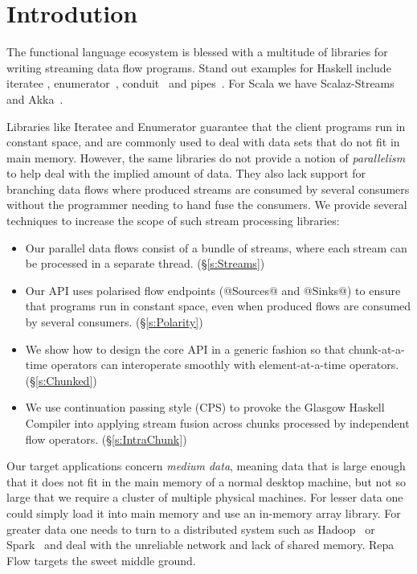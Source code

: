 \section{Introdution}

The functional language ecosystem is blessed with a multitude of libraries for writing streaming data flow programs. Stand out examples for Haskell include iteratee \cite{Kiselyov:iteratee}, enumerator~\cite{hackage:enumerator}, conduit~\cite{hackage:conduit} and pipes~\cite{hackage:pipes}. For Scala we have Scalaz-Streams~\cite{github:scalaz-streams} and Akka~\cite{github:akka}.

Libraries like Iteratee and Enumerator guarantee that the client programs run in constant space, and are commonly used to deal with data sets that do not fit in main memory. However, the same libraries do not provide a notion of \emph{parallelism} to help deal with the implied amount of data. They also lack support for branching data flows where produced streams are consumed by several consumers without the programmer needing to hand fuse the consumers. We provide several techniques to increase the scope of such stream processing libraries:

\begin{itemize}
\item Our parallel data flows consist of a bundle of streams, where each stream can be processed in a separate thread. (\S\ref{s:Streams})

\item Our API uses polarised flow endpoints (@Sources@ and @Sinks@) to ensure that programs run in constant space, even when produced flows are consumed by several consumers. (\S\ref{s:Polarity})

\item We show how to design the core API in a generic fashion so that chunk-at-a-time operators can interoperate smoothly with element-at-a-time operators. (\S\ref{s:Chunked})

\item We use continuation passing style (CPS) to provoke the Glasgow Haskell Compiler into applying stream fusion across chunks processed by independent flow operators. (\S\ref{s:IntraChunk})



\end{itemize}

Our target applications concern \emph{medium data}, meaning data that is large enough that it does not fit in the main memory of a normal desktop machine, but not so large that we require a cluster of multiple physical machines. For lesser data one could simply load it into main memory and use an in-memory array library. For greater data one needs to turn to a distributed system such as Hadoop~\cite{Shvachko:Hadoop} or Spark~\cite{Zaharia:RDDs} and deal with the unreliable network and lack of shared memory. Repa Flow targets the sweet middle ground.

